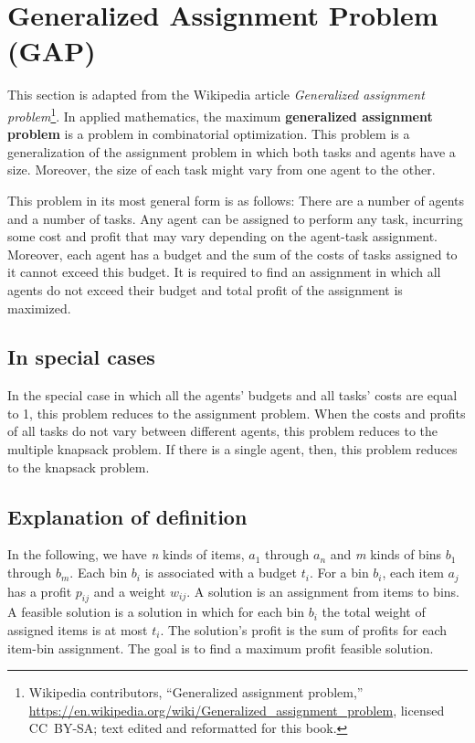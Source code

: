 \section{Generalized Assignment Problem (GAP)}

This section is adapted from the Wikipedia article \emph{Generalized assignment problem}\footnote{Wikipedia contributors, ``Generalized assignment problem,'' \url{https://en.wikipedia.org/wiki/Generalized_assignment_problem}, licensed CC~BY-SA; text edited and reformatted for this book.}.
In applied mathematics, the maximum
\textbf{generalized assignment problem} is a problem in
combinatorial optimization. This
problem is a generalization of the
assignment problem in which both tasks and
agents have a size. Moreover, the size of each
task might vary from one agent to the other.

This problem in its most general form is as follows: There are a number
of agents and a number of tasks. Any agent can be assigned to perform
any task, incurring some cost and profit that may vary depending on the
agent-task assignment. Moreover, each agent has a budget and the sum of
the costs of tasks assigned to it cannot exceed this budget. It is
required to find an assignment in which all agents do not exceed their
budget and total profit of the assignment is maximized.

\subsection{In special cases}\label{in-special-cases}

In the special case in which all the agents' budgets and all tasks'
costs are equal to 1, this problem reduces to the
assignment problem. When the costs and
profits of all tasks do not vary between different agents, this problem
reduces to the multiple knapsack problem. If there is a single agent,
then, this problem reduces to the knapsack problem.

\subsection{Explanation of definition}\label{explanation-of-definition}

In the following, we have \emph{n} kinds of items, \(a_1\) through
\(a_n\) and \emph{m} kinds of bins \(b_1\) through \(b_m\). Each bin
\(b_i\) is associated with a budget \(t_i\). For a bin \(b_i\), each
item \(a_j\) has a profit \(p_{ij}\) and a weight \(w_{ij}\). A solution
is an assignment from items to bins. A feasible solution is a solution
in which for each bin \(b_i\) the total weight of assigned items is at
most \(t_i\). The solution's profit is the sum of profits for each
item-bin assignment. The goal is to find a maximum profit feasible
solution.

